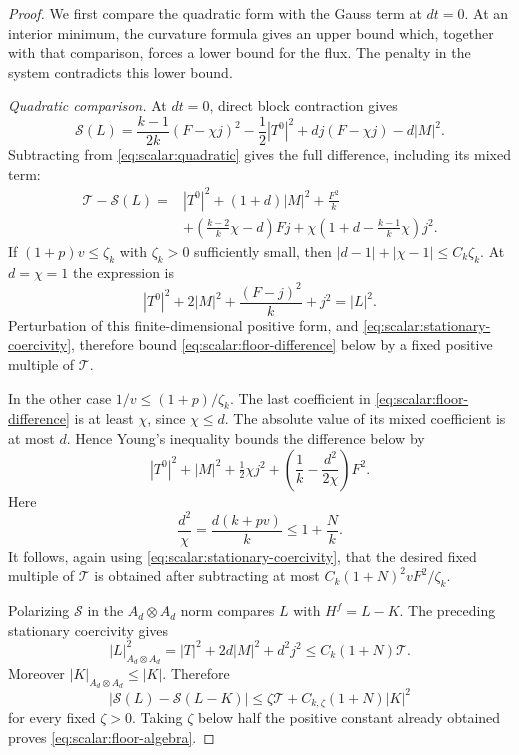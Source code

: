 \begin{proof}
We first compare the quadratic form with the Gauss term at $dt=0$.
At an interior minimum, the curvature formula gives an upper bound
which, together with that comparison, forces a lower bound for the
flux.  The penalty in the system contradicts this lower bound.

\emph{Quadratic comparison.} At $dt=0$, direct block contraction gives
\[
 \mathcal S(L)=\frac{k-1}{2k}(F-\chi j)^2
      -\frac12|T^0|^2+dj(F-\chi j)-d|M|^2.
\]
Subtracting from \eqref{eq:scalar:quadratic} gives the full
difference, including its mixed term:
\begin{equation}
 \begin{aligned}
 \mathcal T-\mathcal S(L)={}&|T^0|^2+(1+d)|M|^2+\frac{F^2}{k}\\
  &+\left(\frac{k-2}{k}\chi-d\right)Fj
        +\chi\left(1+d-\frac{k-1}{k}\chi\right)j^2.
 \end{aligned}
 \label{eq:scalar:floor-difference}
\end{equation}
If $(1+p)v\leq\zeta_k$ with $\zeta_k>0$ sufficiently small, then
$|d-1|+|\chi-1|\leq C_k\zeta_k$.  At $d=\chi=1$ the expression is
\[
 |T^0|^2+2|M|^2+\frac{(F-j)^2}{k}+j^2=|L|^2.
\]
Perturbation of this finite-dimensional positive form, and
\eqref{eq:scalar:stationary-coercivity}, therefore bound
\eqref{eq:scalar:floor-difference} below by a fixed positive
multiple of $\mathcal T$.

In the other case $1/v\leq(1+p)/\zeta_k$.  The last coefficient in
\eqref{eq:scalar:floor-difference} is at least $\chi$,
since $\chi\leq d$.  The absolute value of its mixed coefficient is
at most $d$.  Hence Young's inequality bounds the difference below by
\[
 |T^0|^2+|M|^2+\tfrac12\chi j^2
                  +\left(\frac1k-\frac{d^2}{2\chi}\right)F^2.
\]
Here
\[
 \frac{d^2}{\chi}=\frac{d(k+pv)}k\leq1+\frac Nk.
\]
It follows, again using
\eqref{eq:scalar:stationary-coercivity}, that the desired
fixed multiple of $\mathcal T$ is obtained after subtracting at most
$C_k(1+N)^2vF^2/\zeta_k$.

Polarizing $\mathcal S$ in the $A_d\otimes A_d$ norm compares
$L$ with $H^f=L-K$.  The preceding stationary coercivity gives
\[
 |L|_{A_d\otimes A_d}^2
   =|T|^2+2d|M|^2+d^2j^2\leq C_k(1+N)\mathcal T.
\]
Moreover $|K|_{A_d\otimes A_d}\leq|K|$.  Therefore
\[
 |\mathcal S(L)-\mathcal S(L-K)|
       \leq \zeta\mathcal T+C_{k,\zeta}(1+N)|K|^2
\]
for every fixed $\zeta>0$.  Taking $\zeta$ below half the positive
constant already obtained proves
\eqref{eq:scalar:floor-algebra}.


\end{proof}
